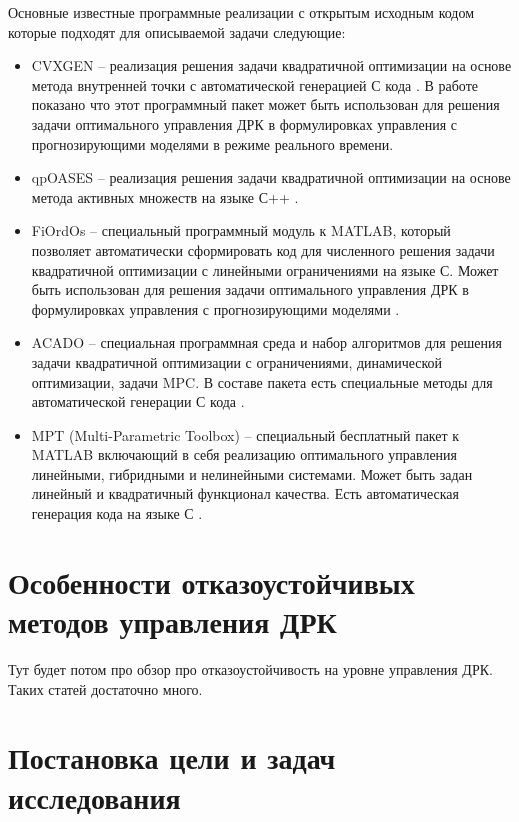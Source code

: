 Основные известные программные реализации с открытым исходным кодом которые подходят для описываемой задачи следующие:
\begin{itemize}
    \item CVXGEN -- реализация решения задачи квадратичной оптимизации на основе метода внутренней точки с автоматической генерацией С кода \cite{mattingley2010real}. В работе \cite{10.1109/icca.2011.6137940} показано что этот программный пакет может быть использован для решения задачи оптимального управления ДРК в формулировках управления с прогнозирующими моделями в режиме реального времени.
    \item qpOASES -- реализация решения задачи квадратичной оптимизации на основе метода активных множеств на языке С++ \cite{ferreau2014qpoases}.
    \item FiOrdOs -- специальный программный модуль к MATLAB, который позволяет автоматически сформировать код для численного решения задачи квадратичной оптимизации с линейными ограничениями на языке С. Может быть использован для решения задачи оптимального управления ДРК в формулировках управления с прогнозирующими моделями \cite{jones2012fast}.
    \item ACADO -- специальная программная среда и набор алгоритмов для решения задачи квадратичной оптимизации с ограничениями, динамической оптимизации, задачи MPC. В составе пакета есть специальные методы для автоматической генерации С кода \cite{houska2011acado}.
    \item MPT (Multi-Parametric Toolbox) -- специальный бесплатный пакет к MATLAB включающий в себя реализацию оптимального управления линейными, гибридными и нелинейными системами. Может быть задан линейный и квадратичный функционал качества. Есть автоматическая генерация кода на языке С \cite{kvasnica2004multi}.
\end{itemize}

\section{Особенности отказоустойчивых методов управления ДРК}\label{sec:Propulsion/FaultToulerant}
\begin{noteplan}
    Тут будет потом про обзор про отказоустойчивость на уровне управления ДРК. Таких статей достаточно много.
\end{noteplan}

\section{Постановка цели и задач исследования}\label{sec:Statement/SetProblems}

